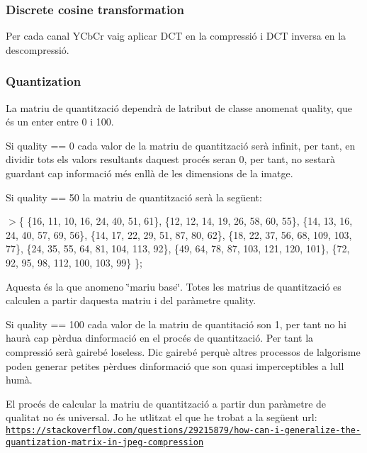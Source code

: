 \subsubsection*{Discrete cosine transformation}

Per cada canal Y\+Cb\+Cr vaig aplicar D\+CT en la compressió i D\+CT inversa en la descompressió.

\subsubsection*{Quantization}

La matriu de quantització dependrà de l\textquotesingle{}atribut de classe anomenat quality, que és un enter entre 0 i 100.

Si quality == 0 cada valor de la matriu de quantització serà infinit, per tant, en dividir tots els valors resultants d\textquotesingle{}aquest procés seran 0, per tant, no s\textquotesingle{}estarà guardant cap informació més enllà de les dimensions de la imatge.

Si quality == 50 la matriu de quantització serà la següent\+:

$>$\{ \{16, 11, 10, 16, 24, 40, 51, 61\}, \{12, 12, 14, 19, 26, 58, 60, 55\}, \{14, 13, 16, 24, 40, 57, 69, 56\}, \{14, 17, 22, 29, 51, 87, 80, 62\}, \{18, 22, 37, 56, 68, 109, 103, 77\}, \{24, 35, 55, 64, 81, 104, 113, 92\}, \{49, 64, 78, 87, 103, 121, 120, 101\}, \{72, 92, 95, 98, 112, 100, 103, 99\} \};

Aquesta és la que anomeno \char`\"{}mariu base\char`\"{}. Totes les matrius de quantització es calculen a partir d\textquotesingle{}aquesta matriu i del paràmetre quality.

Si quality == 100 cada valor de la matriu de quantitació son 1, per tant no hi haurà cap pèrdua d\textquotesingle{}informació en el procés de quantització. Per tant la compressió serà gairebé loseless. Dic gairebé perquè altres processos de l\textquotesingle{}algorisme poden generar petites pèrdues d\textquotesingle{}informació que son quasi imperceptibles a l\textquotesingle{}ull humà.

El procés de calcular la matriu de quantització a partir d\textquotesingle{}un paràmetre de qualitat no és universal. Jo he utlitzat el que he trobat a la següent url\+: \href{https://stackoverflow.com/questions/29215879/how-can-i-generalize-the-quantization-matrix-in-jpeg-compression}{\tt https\+://stackoverflow.\+com/questions/29215879/how-\/can-\/i-\/generalize-\/the-\/quantization-\/matrix-\/in-\/jpeg-\/compression}

